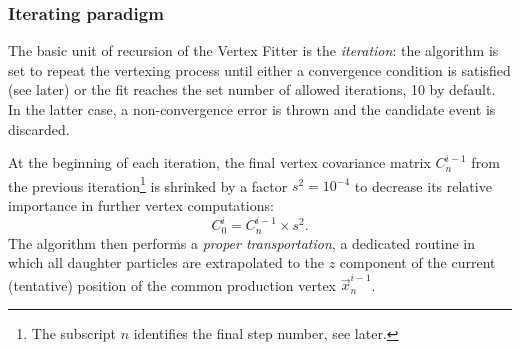 \subsubsection{Iterating paradigm}
The basic unit of recursion of the Vertex Fitter is the \textit{iteration}:
the algorithm is set to repeat the vertexing process until either a convergence condition is satisfied (see later) or the fit reaches the set number of allowed iterations, 10 by default.
In the latter case, a non-convergence error is thrown and the candidate event is discarded.

At the beginning of each iteration, the final vertex covariance matrix $C^{i-1}_n$ from the previous iteration\footnote{The subscript $n$ identifies the final step number, see later.} is shrinked by a factor $s^2 = {10}^{-4}$ to decrease its relative importance in further vertex computations:
\begin{equation}
	C^{i}_0 = C^{i-1}_n \times s^2.
\end{equation}
The algorithm then performs a \textit{proper transportation}, a dedicated routine in which all daughter particles are extrapolated to the $z$ component of the current (tentative) position of the common production vertex $\vec{x}_n^{i-1}$.

